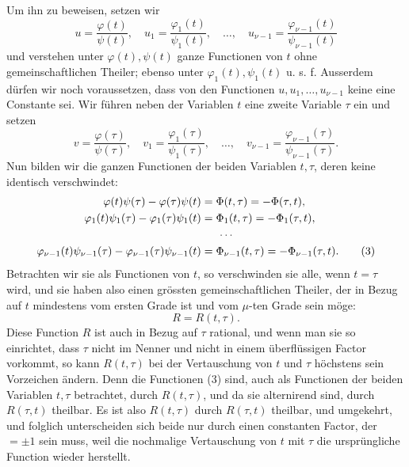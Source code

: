 \documentclass[11pt]{article}
\begin{document}
Um ihn zu beweisen, setzen wir
\begin{equation}
u=\frac{\varphi(t)}{\psi(t)},\quad
u_1=\frac{\varphi_1(t)}{\psi_1(t)},\quad\ldots,\quad
u_{\nu-1}=\frac{\varphi_{\nu-1}(t)}{\psi_{\nu-1}(t)}
\tag{1}
\end{equation}
und verstehen unter \(\varphi(t),\psi(t)\) ganze Functionen von \(t\) ohne gemeinschaftlichen Theiler; ebenso unter \(\varphi_1(t),\psi_1(t)\) u. s. f. Ausserdem dürfen wir noch voraussetzen, dass von den Functionen \(u,u_1,\ldots,u_{\nu-1}\) keine eine Constante sei. Wir führen neben der Variablen \(t\) eine zweite Variable \(\tau\) ein und setzen
\begin{equation}
v=\frac{\varphi(\tau)}{\psi(\tau)},\quad
v_1=\frac{\varphi_1(\tau)}{\psi_1(\tau)},\quad\ldots,\quad
v_{\nu-1}=\frac{\varphi_{\nu-1}(\tau)}{\psi_{\nu-1}(\tau)}.
\tag{2}
\end{equation}
Nun bilden wir die ganzen Functionen der beiden Variablen \(t,\tau\), deren keine identisch verschwindet:
\begin{align}
\varphi(t)\psi(\tau)-\varphi(\tau)\psi(t)
&=\Phi(t,\tau)=-\Phi(\tau,t),\notag\\
\varphi_1(t)\psi_1(\tau)-\varphi_1(\tau)\psi_1(t)
&=\Phi_1(t,\tau)=-\Phi_1(\tau,t),\notag\\
&\hspace{1.5em}\cdots\notag\\
\varphi_{\nu-1}(t)\psi_{\nu-1}(\tau)-\varphi_{\nu-1}(\tau)\psi_{\nu-1}(t)
&=\Phi_{\nu-1}(t,\tau)=-\Phi_{\nu-1}(\tau,t).
\tag{3}
\end{align}
Betrachten wir sie als Functionen von \(t\), so verschwinden sie alle, wenn \(t=\tau\) wird, und sie haben also einen grössten gemeinschaftlichen Theiler, der in Bezug auf \(t\) mindestens vom ersten Grade ist und vom \(\mu\)-ten Grade sein möge:
\begin{equation}
R=R(t,\tau).
\tag{4}
\end{equation}
Diese Function \(R\) ist auch in Bezug auf \(\tau\) rational, und wenn man sie so einrichtet, dass \(\tau\) nicht im Nenner und nicht in einem überflüssigen Factor vorkommt, so kann \(R(t,\tau)\) bei der Vertauschung von \(t\) und \(\tau\) höchstens sein Vorzeichen ändern. Denn die Functionen (3) sind, auch als Functionen der beiden Variablen \(t,\tau\) betrachtet, durch \(R(t,\tau)\), und da sie alternirend sind, durch \(R(\tau,t)\) theilbar. Es ist also \(R(t,\tau)\) durch \(R(\tau,t)\) theilbar, und umgekehrt, und folglich unterscheiden sich beide nur durch einen constanten Factor, der \(=\pm1\) sein muss, weil die nochmalige Vertauschung von \(t\) mit \(\tau\) die ursprüngliche Function wieder herstellt.
\end{document}

